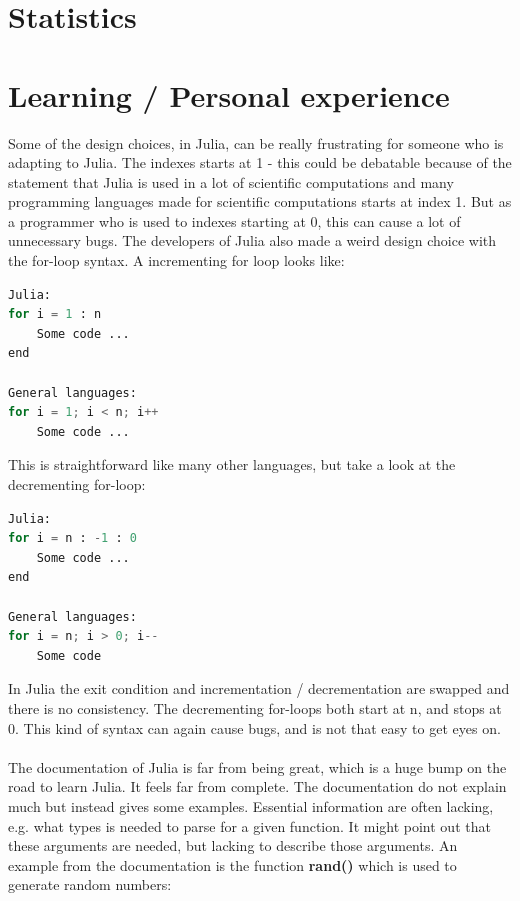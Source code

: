 \documentclass[a4paper,11pt]{article}
\begin{document}
\section{Statistics}

\section{Learning / Personal experience}
Some of the design choices, in Julia, can be really frustrating for someone who is adapting to Julia. The indexes starts at 1 - this could be debatable because of the statement that Julia is used in a lot of scientific computations and many programming languages made for scientific computations starts at index 1. But as a programmer who is used to indexes starting at 0, this can cause a lot of unnecessary bugs. The developers of Julia also made a weird design choice with the for-loop syntax. A incrementing for loop looks like:
\begin{lstlisting}[language=python]
Julia:
for i = 1 : n
	Some code ...
end

General languages:
for i = 1; i < n; i++
	Some code ...
\end{lstlisting}
This is straightforward like many other languages, but take a look at the decrementing for-loop:
\begin{lstlisting}[language=python]
Julia:
for i = n : -1 : 0
	Some code ...
end

General languages:
for i = n; i > 0; i--
	Some code
\end{lstlisting}
In Julia the exit condition and incrementation / decrementation are swapped and there is no consistency. The decrementing for-loops both start at n, and stops at 0. This kind of syntax can again cause bugs, and is not that easy to get eyes on.\\
\\
The documentation of Julia is far from being great, which is a huge bump on the road to learn Julia. It feels far from complete. The documentation do not explain much but instead gives some examples. Essential information are often lacking, e.g. what types is needed to parse for a given function. It might point out that these arguments are needed, but lacking to describe those arguments. An example from the documentation is the function \textbf{rand()} which is used to generate random numbers:
\end{document}
